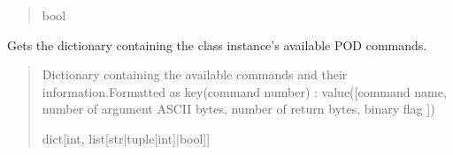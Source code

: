 \documentclass[letterpaper,10pt,english]{sphinxmanual}
\begin{document}
\begin{fulllineitems}
\begin{fulllineitems}
\begin{quote}
\begin{description}
\sphinxAtStartPar
bool

\end{description}\end{quote}

\end{fulllineitems}


\begin{fulllineitems}
\label{\detokenize{PodApi.Devices:PodApi.Devices.BasicPodProtocol.Pod.GetDeviceCommands}}
\pysigstartsignatures
{}
\pysigstopsignatures
\sphinxAtStartPar
Gets the dictionary containing the class instance’s available POD commands.
\begin{quote}\begin{description}
\sphinxAtStartPar
Dictionary containing the available commands and their                 information.Formatted as key(command number) : value({[}command name, number of argument                 ASCII bytes, number of return bytes, binary flag {]})

\sphinxAtStartPar
dict{[}int, list{[}str|tuple{[}int{]}|bool{]}{]}

\end{description}\end{quote}

\end{fulllineitems}



\end{fulllineitems}
\end{document}
